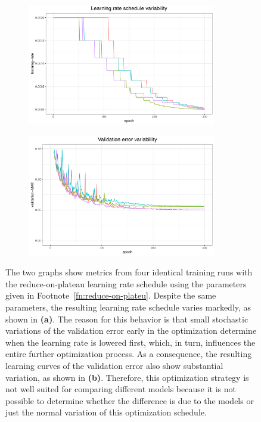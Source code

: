 \begin{figure}[H]
	\begin{subfigure}{\textwidth}
		\centering
		\includegraphics[width=0.9\textwidth]{figures/optimization-variablility-lr}
		\caption{}
		\label{fig:sub-a}
	\end{subfigure}
	\vfill
	\begin{subfigure}{\textwidth}
		\centering
		\includegraphics[width=0.9\textwidth]{figures/optimization-variablility-mae}
		\caption{}
		\label{fig:sub-b}
	\end{subfigure}
	\caption{The two graphs show metrics from four identical training runs with the reduce-on-plateau learning rate schedule using the parameters given in Footnote~\ref{fn:reduce-on-plateu}. Despite the same parameters, the resulting learning rate schedule varies markedly, as shown in \textbf{(a)}. The reason for this behavior is that small stochastic variations of the validation error early in the optimization determine when the learning rate is lowered first, which, in turn, influences the entire further optimization process. As a consequence, the resulting learning curves of the validation error also show substantial variation, as shown in \textbf{(b)}. Therefore, this optimization strategy is not well suited for comparing different models because it is not possible to determine whether the difference is due to the models or just the normal variation of this optimization schedule.}
	\label{fig:optimization-variablility}
\end{figure}

